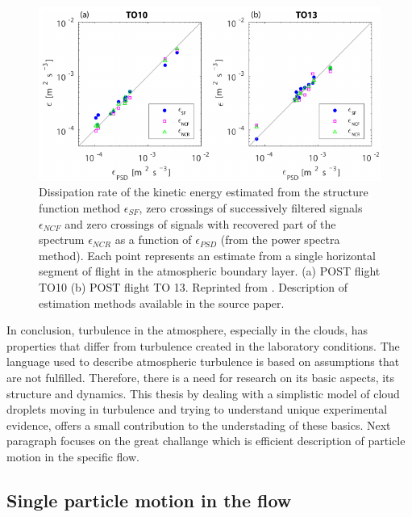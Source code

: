 \documentclass[../main.tex]{subfiles}
\begin{document}
\begin{figure}
\centering
\noindent \includegraphics[width=30pc]{gfx/epsilon_methods_POST.png}
\caption{Dissipation rate of the kinetic energy estimated from the structure function method $\epsilon_{SF}$, zero crossings of successively filtered signals $\epsilon_{NCF}$ and zero crossings of signals with recovered part of the spectrum $\epsilon_{NCR}$ as a function of $\epsilon_{PSD}$ (from the power spectra
method). Each point represents an estimate from a single horizontal segment of flight in the atmospheric boundary layer. (a) POST flight TO10 (b) POST flight TO 13. Reprinted from \citet{Waclawczyk2017}. Description of estimation methods available in the source paper.}
\label{fig:ch1_04}
\end{figure}
In conclusion, turbulence in the atmosphere, especially in the clouds, has properties that differ from turbulence created in the laboratory conditions. The language used to describe atmospheric turbulence is based on assumptions that are not fulfilled. Therefore, there is a need for research on its basic aspects, its structure and dynamics. This thesis by dealing with a simplistic model of cloud droplets moving in turbulence and trying to understand unique experimental evidence, offers a small contribution to the understading of these basics. Next paragraph focuses on the great challange which is efficient description of particle motion in the specific flow.


\subsection{Single particle motion in the flow}
\end{document}

